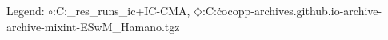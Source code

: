 Legend: {\color{CornflowerBlue}$\circ$}:C:\Users\tristan\Documents\ppsn\BBOB\raw\_res\remaining\_runs\new\_ic\exdata\LB+IC-CMA, {\color{Orange}$\diamondsuit$}:C:\Users\tristan\.cocopp\data-archives\numbbo.github.io\data-archive\data-archive\bbob-mixint\CMA-ESwM\_Hamano.tgz